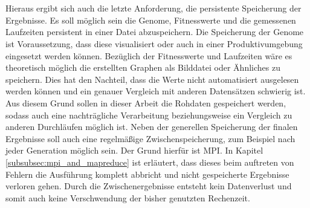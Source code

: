 \\\\
Hieraus ergibt sich auch die letzte Anforderung, die persistente Speicherung der Ergebnisse. Es soll möglich sein die Genome, Fitnesswerte und die gemessenen Laufzeiten persistent in einer Datei abzuspeichern. Die Speicherung der Genome ist Voraussetzung, dass diese visualisiert oder auch in einer Produktivumgebung eingesetzt werden können. Bezüglich der Fitnesswerte und Laufzeiten wäre es theoretisch möglich die erstellten Graphen als Bilddatei oder Ähnliches zu speichern. Dies hat den Nachteil, dass die Werte nicht automatisiert ausgelesen werden können und ein genauer Vergleich mit anderen Datensätzen schwierig ist. Aus diesem Grund sollen in dieser Arbeit die Rohdaten gespeichert werden, sodass auch eine nachträgliche Verarbeitung beziehungsweise ein Vergleich zu anderen Durchläufen möglich ist. Neben der generellen Speicherung der finalen Ergebnisse soll auch eine regelmäßige Zwischenspeicherung, zum Beispiel nach jeder Generation möglich sein. Der Grund hierfür ist \ac{MPI}. In Kapitel \ref{subsubsec:mpi_and_mapreduce} ist erläutert, dass dieses beim auftreten von Fehlern die Ausführung komplett abbricht und nicht gespeicherte Ergebnisse verloren gehen. Durch die Zwischenergebnisse entsteht kein Datenverlust und somit auch keine Verschwendung der bisher genutzten Rechenzeit.




